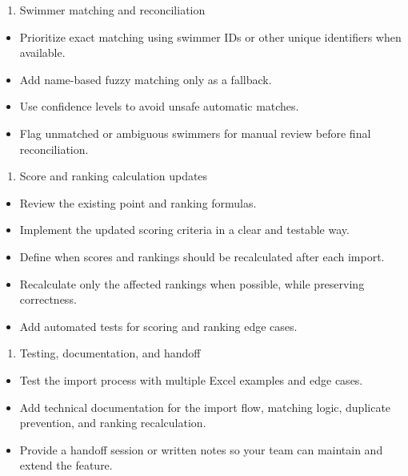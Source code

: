 \documentclass[11pt,a4paper]{article}
\begin{document}
\begin{enumerate}
\item Swimmer matching and reconciliation
\end{enumerate}

\begin{itemize}
\item Prioritize exact matching using swimmer IDs or other unique identifiers when available.
\item Add name-based fuzzy matching only as a fallback.
\item Use confidence levels to avoid unsafe automatic matches.
\item Flag unmatched or ambiguous swimmers for manual review before final reconciliation.
\end{itemize}

\begin{enumerate}
\item Score and ranking calculation updates
\end{enumerate}

\begin{itemize}
\item Review the existing point and ranking formulas.
\item Implement the updated scoring criteria in a clear and testable way.
\item Define when scores and rankings should be recalculated after each import.
\item Recalculate only the affected rankings when possible, while preserving correctness.
\item Add automated tests for scoring and ranking edge cases.
\end{itemize}

\begin{enumerate}
\item Testing, documentation, and handoff
\end{enumerate}

\begin{itemize}
\item Test the import process with multiple Excel examples and edge cases.
\item Add technical documentation for the import flow, matching logic, duplicate prevention, and ranking recalculation.
\item Provide a handoff session or written notes so your team can maintain and extend the feature.
\end{itemize}
\end{document}
